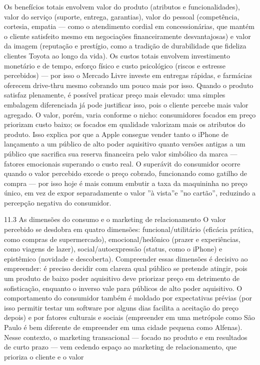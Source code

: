 Os benefícios totais envolvem valor do produto (atributos e funcionalidades), valor do serviço (suporte, entrega, garantias), valor do pessoal (competência, cortesia, empatia — como o atendimento cordial em concessionárias, que mantém o cliente satisfeito mesmo em negociações financeiramente desvantajosas) e valor da imagem (reputação e prestígio, como a tradição de durabilidade que fideliza clientes Toyota ao longo da vida). Os custos totais envolvem investimento monetário e de tempo, esforço físico e custo psicológico (riscos e estresse percebidos) — por isso o Mercado Livre investe em entregas rápidas, e farmácias oferecem drive-thru mesmo cobrando um pouco mais por isso. Quando o produto satisfaz plenamente, é possível praticar preço mais elevado: uma simples embalagem diferenciada já pode justificar isso, pois o cliente percebe mais valor agregado. O valor, porém, varia conforme o nicho: consumidores focados em preço priorizam custo baixo; os focados em qualidade valorizam mais os atributos do produto. Isso explica por que a Apple consegue vender tanto o iPhone de lançamento a um público de alto poder aquisitivo quanto versões antigas a um público que sacrifica sua reserva financeira pelo valor simbólico da marca — fatores emocionais superando o custo real. O superávit do consumidor ocorre quando o valor percebido excede o preço cobrado, funcionando como gatilho de compra — por isso hoje é mais comum embutir a taxa da maquininha no preço único, em vez de expor separadamente o valor ”à vista”e ”no cartão”, reduzindo a percepção negativa do consumidor.

11.3 As dimensões do consumo e o marketing de relacionamento O valor percebido se desdobra em quatro dimensões: funcional/utilitário (eficácia prática, como compras de supermercado), emocional/hedônico (prazer e experiências, como viagens de lazer), social/autoexpressão (status, como o iPhone) e epistêmico (novidade e descoberta). Compreender essas dimensões é decisivo ao empreender: é preciso decidir com clareza qual público se pretende atingir, pois um produto de baixo poder aquisitivo deve priorizar preço em detrimento de sofisticação, enquanto o inverso vale para públicos de alto poder aquisitivo. O comportamento do consumidor também é moldado por expectativas prévias (por isso permitir testar um software por alguns dias facilita a aceitação do preço depois) e por fatores culturais e sociais (empreender em uma metrópole como São Paulo é bem diferente de empreender em uma cidade pequena como Alfenas). Nesse contexto, o marketing transacional — focado no produto e em resultados de curto prazo — vem cedendo espaço ao marketing de relacionamento, que prioriza o cliente e o valor

